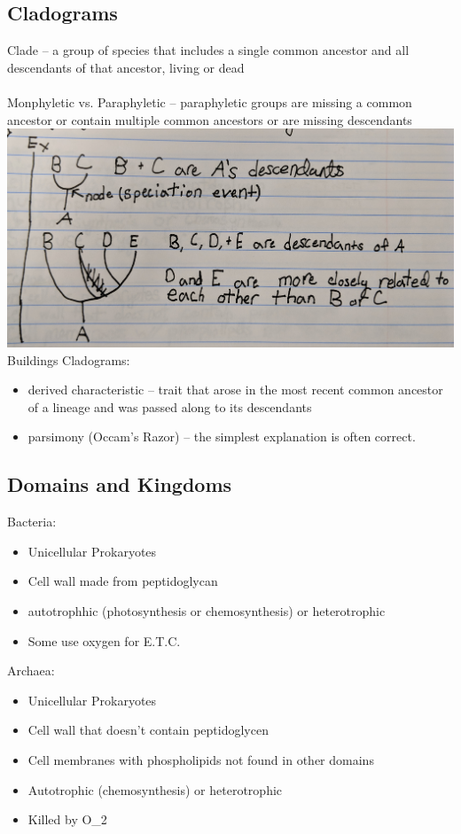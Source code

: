 \documentclass{article}
\begin{document}
\subsection{Cladograms}
Clade -- a group of species that includes a single common ancestor and all descendants of that ancestor, living or dead\\
\\
Monphyletic vs. Paraphyletic -- paraphyletic groups are missing a common ancestor or contain multiple common ancestors or are missing descendants
\\
\includegraphics[scale=0.1]{cladogram}\\
Buildings Cladograms:
\begin{itemize}
\item derived characteristic -- trait that arose in the most recent common ancestor of a lineage and was passed along to its descendants
\item parsimony (Occam's Razor) -- the simplest explanation is often correct.
\end{itemize}

\subsection{Domains and Kingdoms}

Bacteria:
\begin{itemize}
\item Unicellular Prokaryotes
\item Cell wall made from peptidoglycan
\item autotrophhic (photosynthesis or chemosynthesis) or heterotrophic
\item Some use oxygen for E.T.C.
\end{itemize}

Archaea:
\begin{itemize}
\item Unicellular Prokaryotes
\item Cell wall that doesn't contain peptidoglycen
\item Cell membranes with phospholipids not found in other domains
\item Autotrophic (chemosynthesis) or heterotrophic
\item Killed by O_2
\end{itemize}
\end{document}
